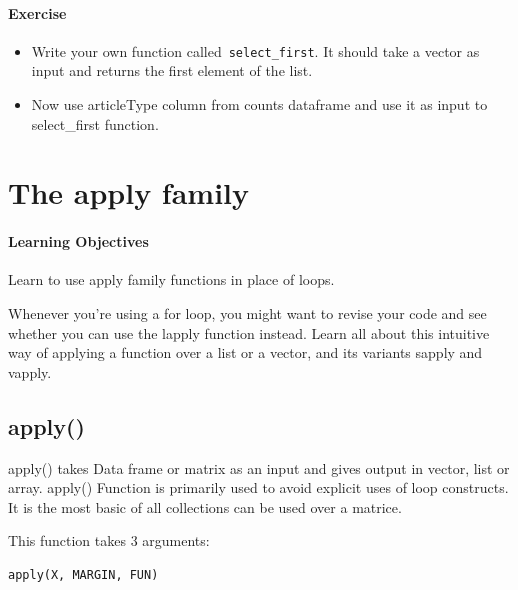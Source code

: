 \documentclass[
]{book}
\providecommand{\tightlist}{%
  \setlength{\itemsep}{0pt}\setlength{\parskip}{0pt}}
\begin{document}
\hypertarget{exercise}{%
\subsubsection*{Exercise}\label{exercise}}

\begin{itemize}
\tightlist
\item
  Write your own function called~\texttt{select\_first}. It should take a vector as input and returns the first element of the list.
\item
  Now use articleType column from counts dataframe and use it as input to select\_first function.
\end{itemize}

\hypertarget{the-apply-family}{%
\chapter{The apply family}\label{the-apply-family}}

\hypertarget{learning-objectives-2}{%
\subsubsection*{Learning Objectives}\label{learning-objectives-2}}

Learn to use apply family functions in place of loops.

Whenever you're using a for loop, you might want to revise your code and see whether you can use the lapply function instead. Learn all about this intuitive way of applying a function over a list or a vector, and its variants sapply and vapply.

\hypertarget{apply}{%
\section{apply()}\label{apply}}

apply() takes Data frame or matrix as an input and gives output in vector, list or array. apply() Function is primarily used to avoid explicit uses of loop constructs. It is the most basic of all collections can be used over a matrice.

This function takes 3 arguments:

\begin{verbatim}
apply(X, MARGIN, FUN)
\end{verbatim}
\end{document}
